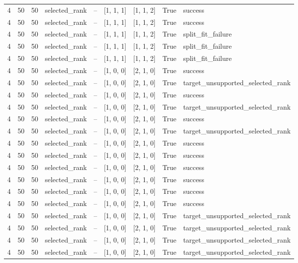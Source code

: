 \begin{longtable}{lllllllll}
4 & 50 & 50 & selected\_rank & -- & [1, 1, 1] & [1, 1, 2] & True & success \\
4 & 50 & 50 & selected\_rank & -- & [1, 1, 1] & [1, 1, 2] & True & success \\
4 & 50 & 50 & selected\_rank & -- & [1, 1, 1] & [1, 1, 2] & True & split\_fit\_failure \\
4 & 50 & 50 & selected\_rank & -- & [1, 1, 1] & [1, 1, 2] & True & split\_fit\_failure \\
4 & 50 & 50 & selected\_rank & -- & [1, 1, 1] & [1, 1, 2] & True & split\_fit\_failure \\
4 & 50 & 50 & selected\_rank & -- & [1, 0, 0] & [2, 1, 0] & True & success \\
4 & 50 & 50 & selected\_rank & -- & [1, 0, 0] & [2, 1, 0] & True & target\_unsupported\_selected\_rank \\
4 & 50 & 50 & selected\_rank & -- & [1, 0, 0] & [2, 1, 0] & True & success \\
4 & 50 & 50 & selected\_rank & -- & [1, 0, 0] & [2, 1, 0] & True & target\_unsupported\_selected\_rank \\
4 & 50 & 50 & selected\_rank & -- & [1, 0, 0] & [2, 1, 0] & True & success \\
4 & 50 & 50 & selected\_rank & -- & [1, 0, 0] & [2, 1, 0] & True & target\_unsupported\_selected\_rank \\
4 & 50 & 50 & selected\_rank & -- & [1, 0, 0] & [2, 1, 0] & True & success \\
4 & 50 & 50 & selected\_rank & -- & [1, 0, 0] & [2, 1, 0] & True & success \\
4 & 50 & 50 & selected\_rank & -- & [1, 0, 0] & [2, 1, 0] & True & success \\
4 & 50 & 50 & selected\_rank & -- & [1, 0, 0] & [2, 1, 0] & True & success \\
4 & 50 & 50 & selected\_rank & -- & [1, 0, 0] & [2, 1, 0] & True & success \\
4 & 50 & 50 & selected\_rank & -- & [1, 0, 0] & [2, 1, 0] & True & success \\
4 & 50 & 50 & selected\_rank & -- & [1, 0, 0] & [2, 1, 0] & True & target\_unsupported\_selected\_rank \\
4 & 50 & 50 & selected\_rank & -- & [1, 0, 0] & [2, 1, 0] & True & target\_unsupported\_selected\_rank \\
4 & 50 & 50 & selected\_rank & -- & [1, 0, 0] & [2, 1, 0] & True & target\_unsupported\_selected\_rank \\
4 & 50 & 50 & selected\_rank & -- & [1, 0, 0] & [2, 1, 0] & True & target\_unsupported\_selected\_rank \\

\end{longtable}
